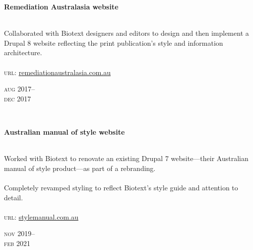 \begin{minipage}[t]{\mainboxwidth\textwidth}
\textbf{Remediation Australasia website}\\
{\small
\\
Collaborated with Biotext designers and editors to design and then implement a Drupal 8 website reflecting
the print publication's style and information architecture. \\
\\
\textsc{url}: \href{https://www.remediationaustralasia.com.au/}{remediationaustralasia.com.au} 
\par
}
\end{minipage}
\begin{minipage}[t]{\detailboxwidth\textwidth}
{
\hfill \textsc{aug} 2017--\\ 
\hspace*{0pt} \hfill \textsc{dec} 2017
\par
}
\end{minipage}
\\

\begin{minipage}[t]{\mainboxwidth\textwidth}
\textbf{Australian manual of style website}\\
{\small
\\
Worked with Biotext to renovate an existing Drupal 7 website—their Australian manual of style product—as part of a rebranding.\\
\\
Completely revamped styling to reflect Biotext's style guide and attention to detail.\\ 
\\
\textsc{url}: \href{https://stylemanual.com.au}{stylemanual.com.au} 
\par
}
\end{minipage}
\begin{minipage}[t]{\detailboxwidth\textwidth}
{
\hfill \textsc{nov} 2019--\\ 
\hspace*{0pt} \hfill \textsc{feb} 2021
\par
}
\end{minipage}

